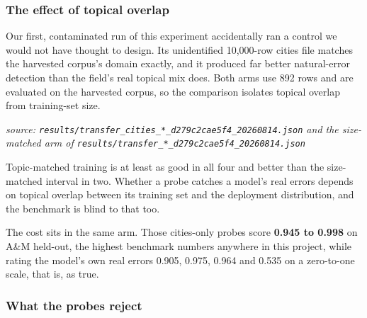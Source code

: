 \documentclass[10pt]{article}
\begin{document}
\subsubsection{The effect of topical overlap}

Our first, contaminated run of this experiment accidentally ran a control we would not have thought to design. Its unidentified 10,000-row cities file matches the harvested corpus's domain exactly, and it produced far better natural-error detection than the field's real topical mix does. Both arms use 892 rows and are evaluated on the harvested corpus, so the comparison isolates topical overlap from training-set size.

{\footnotesize\raggedright\sloppy \emph{source: \texttt{results/transfer\_cities\_*\_d279c2cae5f4\_20260814.json} and the size-matched arm of \texttt{results/transfer\_*\_d279c2cae5f4\_20260814.json}}\par}

\begin{table}[H]
\centering
\small
{}
\end{table}

Topic-matched training is at least as good in all four and better than the size-matched interval in two. Whether a probe catches a model's real errors depends on topical overlap between its training set and the deployment distribution, and the benchmark is blind to that too.

The cost sits in the same arm. Those cities-only probes score \textbf{0.945 to 0.998} on A\&M held-out, the highest benchmark numbers anywhere in this project, while rating the model's own real errors 0.905, 0.975, 0.964 and 0.535 on a zero-to-one scale, that is, as true.

\subsubsection{What the probes reject}
\end{document}
